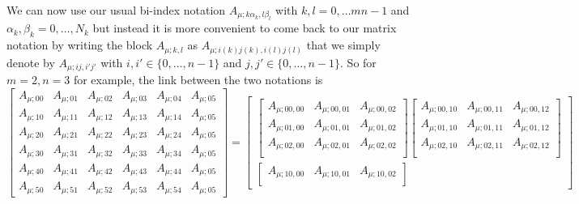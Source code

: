         We can now use our usual bi-index notation $A_{\mu;k\alpha_k,l\beta_l}$ with $k,l=0,\dots mn-1$ and $\alpha_k,\beta_k=0,\dots,N_k$ but instead it is more convenient to come back to our matrix notation by writing the block $A_{\mu;k,l}$ as $A_{\mu;i(k)j(k),i(l)j(l)}$ that we simply denote by $A_{\mu;ij,i'j'}$ with $i,i'\in\{0,\dots,n-1\}$ and $j,j'\in\{0,\dots,n-1\}$. So for $m=2,n=3$ for example, the link between the two notations is
        {\tiny
        \begin{equation}
            \begin{bmatrix}
                A_{\mu;00} & A_{\mu;01} & A_{\mu;02} & A_{\mu;03} & A_{\mu;04} & A_{\mu;05} \\
                A_{\mu;10} & A_{\mu;11} & A_{\mu;12} & A_{\mu;13} & A_{\mu;14} & A_{\mu;05} \\
                A_{\mu;20} & A_{\mu;21} & A_{\mu;22} & A_{\mu;23} & A_{\mu;24} & A_{\mu;05} \\
                A_{\mu;30} & A_{\mu;31} & A_{\mu;32} & A_{\mu;33} & A_{\mu;34} & A_{\mu;05} \\
                A_{\mu;40} & A_{\mu;41} & A_{\mu;42} & A_{\mu;43} & A_{\mu;44} & A_{\mu;05} \\
                A_{\mu;50} & A_{\mu;51} & A_{\mu;52} & A_{\mu;53} & A_{\mu;54} & A_{\mu;05}
            \end{bmatrix}=
            \begin{bmatrix}
                \begin{bmatrix}
                    A_{\mu;00,00} & A_{\mu;00,01} & A_{\mu;00,02}\\
                    A_{\mu;01,00} & A_{\mu;01,01} & A_{\mu;01,02}\\
                    A_{\mu;02,00} & A_{\mu;02,01} & A_{\mu;02,02}\\
                \end{bmatrix}
                \begin{bmatrix}
                    A_{\mu;00,10} & A_{\mu;00,11} & A_{\mu;00,12}\\
                    A_{\mu;01,10} & A_{\mu;01,11} & A_{\mu;01,12}\\
                    A_{\mu;02,10} & A_{\mu;02,11} & A_{\mu;02,12}\\
                \end{bmatrix}\\
                \begin{bmatrix}
                    A_{\mu;10,00} & A_{\mu;10,01} & A_{\mu;10,02}\\

\end{bmatrix}
\end{bmatrix}
\end{equation}}
